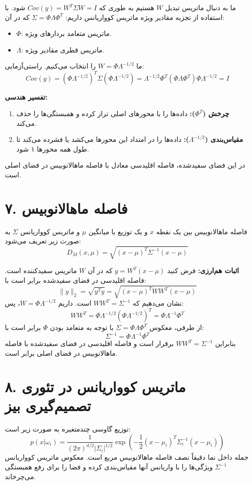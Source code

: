 \documentclass{article}
\begin{document}
ما به دنبال ماتریس تبدیل $W$ هستیم به طوری که $Cov(y) = W^T \Sigma W = I$ شود.
با استفاده از تجزیه مقادیر ویژه ماتریس کوواریانس داریم: $\Sigma = \Phi \Lambda \Phi^T$ که در آن:
\begin{itemize}
    \item $\Phi$: ماتریس متعامد بردارهای ویژه.
    \item $\Lambda$: ماتریس قطری مقادیر ویژه.
\end{itemize}
ما $W = \Phi \Lambda^{-1/2}$ را انتخاب می‌کنیم. راستی‌آزمایی:
\[
Cov(y) = (\Phi \Lambda^{-1/2})^T \Sigma (\Phi \Lambda^{-1/2}) = \Lambda^{-1/2} \Phi^T (\Phi \Lambda \Phi^T) \Phi \Lambda^{-1/2} = I
\]

\textbf{تفسیر هندسی:}
\begin{enumerate}
    \item \textbf{چرخش ($\Phi^T$):} داده‌ها را با محورهای اصلی تراز کرده و همبستگی‌ها را حذف می‌کند.
    \item \textbf{مقیاس‌بندی ($\Lambda^{-1/2}$):} داده‌ها را در امتداد این محورها می‌کشد یا فشرده می‌کند تا طول همه محورها ۱ شود.
\end{enumerate}
در این فضای سفیدشده، فاصله اقلیدسی معادل با فاصله ماهالانوبیس در فضای اصلی است.

\section*{۷. فاصله ماهالانوبیس}
فاصله ماهالانوبیس بین یک نقطه $x$ و یک توزیع با میانگین $\mu$ و ماتریس کوواریانس $\Sigma$ به صورت زیر تعریف می‌شود:
\[
D_M(x, \mu) = \sqrt{(x - \mu)^T \Sigma^{-1} (x - \mu)}
\]

\textbf{اثبات هم‌ارزی:}
فرض کنید $y = W^T(x-\mu)$ که در آن $W$ ماتریس سفیدکننده است. فاصله اقلیدسی در فضای سفیدشده برابر است با:
\[
\|y\|_2 = \sqrt{y^T y} = \sqrt{(x-\mu)^T W W^T (x-\mu)}
\]
نشان می‌دهیم که $W W^T = \Sigma^{-1}$ است. داریم $W = \Phi \Lambda^{-1/2}$، پس:
\[
W W^T = \Phi \Lambda^{-1/2} (\Phi \Lambda^{-1/2})^T = \Phi \Lambda^{-1} \Phi^T
\]
از طرفی، معکوس $\Sigma = \Phi \Lambda \Phi^T$ با توجه به متعامد بودن $\Phi$ برابر است با:
\[
\Sigma^{-1} = \Phi \Lambda^{-1} \Phi^T
\]
بنابراین $W W^T = \Sigma^{-1}$ برقرار است و فاصله اقلیدسی در فضای سفیدشده با فاصله ماهالانوبیس در فضای اصلی برابر است.

\section*{۸. ماتریس کوواریانس در تئوری تصمیم‌گیری بیز}
توزیع گاوسی چندمتغیره به صورت زیر است:
\[
p(x|\omega_i) = \frac{1}{(2\pi)^{d/2} |\Sigma_i|^{1/2}} \exp \left( -\frac{1}{2} (x - \mu_i)^T \Sigma_i^{-1} (x - \mu_i) \right)
\]
جمله داخل نما دقیقاً نصف فاصله ماهالانوبیس مربع است. معکوس ماتریس کوواریانس $\Sigma^{-1}$ ویژگی‌ها را با واریانس آنها مقیاس‌بندی کرده و فضا را برای رفع همبستگی می‌چرخاند.
\end{document}
